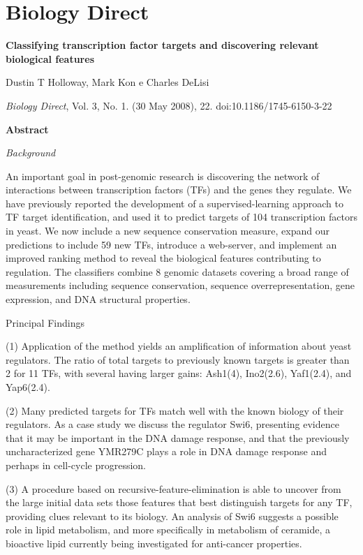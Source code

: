 \chapter{Biology Direct}

{\Large \bf Classifying transcription factor targets and discovering relevant biological features}

Dustin T Holloway, Mark Kon e Charles DeLisi

{\it Biology Direct}, Vol. 3, No. 1. (30 May 2008), 22. doi:10.1186/1745-6150-3-22

{\large \bf Abstract}

{\it Background}

An important goal in post-genomic research is discovering the network of interactions between transcription factors (TFs) and the genes they regulate. We have previously reported the development of a supervised-learning approach to TF target identification, and used it to predict targets of 104 transcription factors in yeast. We now include a new sequence conservation measure, expand our predictions to include 59 new TFs, introduce a web-server, and implement an improved ranking method to reveal the biological features contributing to regulation. The classifiers combine 8 genomic datasets covering a broad range of measurements including sequence conservation, sequence overrepresentation, gene expression, and DNA structural properties.

Principal Findings

(1) Application of the method yields an amplification of information about yeast regulators. The ratio of total targets to previously known targets is greater than 2 for 11 TFs, with several having larger gains: Ash1(4), Ino2(2.6), Yaf1(2.4), and Yap6(2.4).

(2) Many predicted targets for TFs match well with the known biology of their regulators. As a case study we discuss the regulator Swi6, presenting evidence that it may be important in the DNA damage response, and that the previously uncharacterized gene YMR279C plays a role in DNA damage response and perhaps in cell-cycle progression.

(3) A procedure based on recursive-feature-elimination is able to uncover from the large initial data sets those features that best distinguish targets for any TF, providing clues relevant to its biology. An analysis of Swi6 suggests a possible role in lipid metabolism, and more specifically in metabolism of ceramide, a bioactive lipid currently being investigated for anti-cancer properties.

